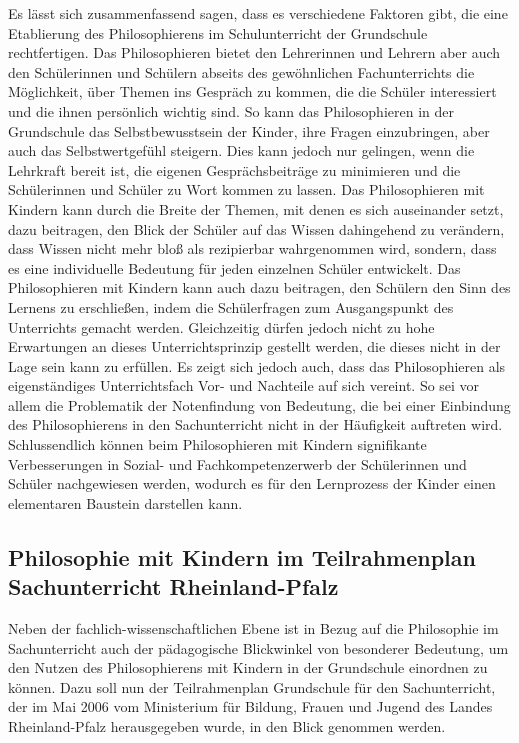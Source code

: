 Es lässt sich zusammenfassend sagen, dass es verschiedene Faktoren gibt, die eine Etablierung des Philosophierens im Schulunterricht der Grundschule rechtfertigen. 
Das Philosophieren bietet den Lehrerinnen und Lehrern aber auch den Schülerinnen und Schülern abseits des gewöhnlichen Fachunterrichts die Möglichkeit, über Themen ins Gespräch zu kommen, die die Schüler interessiert und die ihnen persönlich wichtig sind. 
So kann das Philosophieren in der Grundschule das Selbstbewusstsein der Kinder, ihre Fragen einzubringen, aber auch das Selbstwertgefühl steigern. 
Dies kann jedoch nur gelingen, wenn die Lehrkraft bereit ist, die eigenen Gesprächsbeiträge zu minimieren und die Schülerinnen und Schüler zu Wort kommen zu lassen.
Das Philosophieren mit Kindern kann durch die Breite der Themen, mit denen es sich auseinander setzt, dazu beitragen, den Blick der Schüler auf das Wissen dahingehend zu verändern, dass Wissen nicht mehr bloß als rezipierbar wahrgenommen wird, sondern, dass es eine individuelle Bedeutung für jeden einzelnen Schüler entwickelt.
Das Philosophieren mit Kindern kann auch dazu beitragen, den Schülern den Sinn des Lernens zu erschließen, indem die Schülerfragen zum Ausgangspunkt des Unterrichts gemacht werden.
Gleichzeitig dürfen jedoch nicht zu hohe Erwartungen an dieses Unterrichtsprinzip gestellt werden, die dieses nicht in der Lage sein kann zu erfüllen. 
Es zeigt sich jedoch auch, dass das Philosophieren als eigenständiges Unterrichtsfach Vor- und Nachteile auf sich vereint.
So sei vor allem die Problematik der Notenfindung von Bedeutung, die bei einer Einbindung des Philosophierens in den Sachunterricht nicht in der Häufigkeit auftreten wird.
Schlussendlich können beim Philosophieren mit Kindern signifikante Verbesserungen in Sozial- und Fachkompetenzerwerb der Schülerinnen und Schüler nachgewiesen werden, wodurch es für den Lernprozess der Kinder einen elementaren Baustein darstellen kann.

\newpage
\subsection{Philosophie mit Kindern im Teilrahmenplan Sachunterricht Rheinland-Pfalz}

Neben der fachlich-wissenschaftlichen Ebene ist in Bezug auf die Philosophie im Sachunterricht auch der pädagogische Blickwinkel von besonderer Bedeutung, um den Nutzen des Philosophierens mit Kindern in der Grundschule einordnen zu können. 
Dazu soll nun der Teilrahmenplan Grundschule für den Sachunterricht, der im Mai 2006 vom Ministerium für Bildung, Frauen und Jugend des Landes Rheinland-Pfalz herausgegeben wurde, in den Blick genommen werden. 

